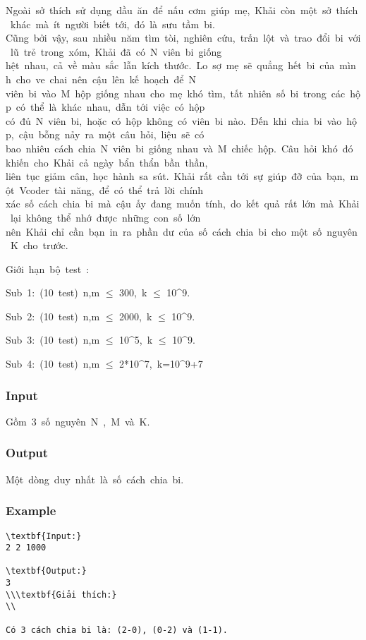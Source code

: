 



   Ngoài sở thích sử dụng dầu ăn để nấu cơm giúp mẹ, Khải còn một sở thích khác mà ít người biết tới, đó là sưu tầm bi. Cũng bởi vậy, sau nhiều năm tìm tòi, nghiên cứu, trấn lột và trao đổi bi với lũ trẻ trong xóm, Khải đã có N viên bi giống hệt nhau, cả về màu sắc lẫn kích thước. Lo sợ mẹ sẽ quẳng hết bi của mình cho ve chai nên cậu lên kế hoạch để N viên bi vào M hộp giống nhau cho mẹ khó tìm, tất nhiên số bi trong các hộp có thể là khác nhau, dẫn tới việc có hộp có đủ N viên bi, hoặc có hộp không có viên bi nào. Đến khi chia bi vào hộp, cậu bỗng nảy ra một câu hỏi, liệu sẽ có bao nhiêu cách chia N viên bi giống nhau và M chiếc hộp. Câu hỏi khó đó khiến cho Khải cả ngày bẩn thẩn bần thần, liên tục giảm cân, học hành sa sút. Khải rất cần tới sự giúp đỡ của bạn, một Vcoder tài năng, để có thể trả lời chính xác số cách chia bi mà cậu ấy đang muốn tính, do kết quả rất lớn mà Khải lại không thể nhớ được những con số lớn nên Khải chỉ cần bạn in ra phần dư của số cách chia bi cho một số nguyên K cho trước.  



   Giới hạn bộ test :  

   Sub 1: (10 test) n,m $\le$ 300, k $\le$ 10^9.  

   Sub 2: (10 test) n,m $\le$ 2000, k $\le$ 10^9.  

   Sub 3: (10 test) n,m $\le$ 10^5, k $\le$ 10^9.  

   Sub 4: (10 test) n,m $\le$ 2*10^7, k=10^9+7  



\subsubsection{   Input  }

   Gồm 3 số nguyên N , M và K.  

\subsubsection{   Output  }

   Một dòng duy nhất là số cách chia bi.  

\subsubsection{   Example  }
\begin{verbatim}
\textbf{Input:}
2 2 1000

\textbf{Output:}
3
\\\textbf{Giải thích:}
\\

Có 3 cách chia bi là: (2-0), (0-2) và (1-1).\end{verbatim}
